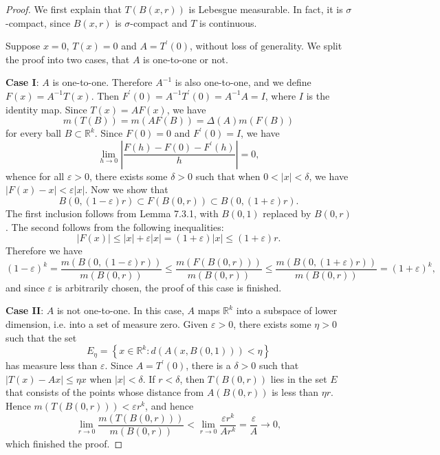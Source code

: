 \begin{proof}
We first explain that $T(B(x,r))$ is Lebesgue measurable. In fact, it is $\sigma$-compact, since $B(x,r)$ is $\sigma$-compact and $T$ is continuous.\par
Suppose $x=0$, $T(x)=0$ and $A=T^\prime(0)$, without loss of generality. We split the proof into two cases, that $A$ is one-to-one or not.\par
\textbf{Case I}: $A$ is one-to-one. Therefore $A^{-1}$ is also one-to-one, and we define $F(x)=A^{-1}T(x)$. Then $F^\prime(0)=A^{-1}T^\prime(0)=A^{-1}A=I$, where $I$ is the identity map. Since $T(x)=AF(x)$, we have 
$$
m\left( T\left( B \right) \right) =m\left( AF\left( B \right) \right) =\Delta \left( A \right) m\left( F\left( B \right) \right) 
$$
for every ball $B\subset\mathbb{R}^k$. Since $F(0)=0$ and $F^\prime(0)=I$, we have 
$$
\lim_{h\rightarrow 0} \left| \frac{F\left( h \right) -F\left( 0 \right) -F^{\prime}\left( h \right)}{h} \right|=0,
$$
whence for all $\varepsilon>0$, there exists some $\delta>0$ such that when $0<|x|<\delta$, we have $|F(x)-x|<\varepsilon|x|$. Now we show that 
$$
B\left( 0,\left( 1-\varepsilon \right) r \right) \subset F\left( B\left( 0,r \right) \right) \subset B\left( 0,\left( 1+\varepsilon \right) r \right) .
$$
The first inclusion follows from Lemma 7.3.1, with $B(0,1)$ replaced by $B(0,r)$. The second follows from the following inequalities: 
$$
\left| F\left( x \right) \right|\le \left| x \right|+\varepsilon \left| x \right|=\left( 1+\varepsilon \right) \left| x \right|\le \left( 1+\varepsilon \right) r.
$$
Therefore we have 
$$
\left( 1-\varepsilon \right) ^k=\frac{m\left( B\left( 0,\left( 1-\varepsilon \right) r \right) \right)}{m\left( B\left( 0,r \right) \right)}\le \frac{m\left( F\left( B\left( 0,r \right) \right) \right)}{m\left( B\left( 0,r \right) \right)}\le \frac{m\left( B\left( 0,\left( 1+\varepsilon \right) r \right) \right)}{m\left( B\left( 0,r \right) \right)}=\left( 1+\varepsilon \right) ^k,
$$
and since $\varepsilon$ is arbitrarily chosen, the proof of this case is finished.\par
\textbf{Case II}: $A$ is not one-to-one. In this case, $A$ maps $\mathbb{R}^k$ into a subspace of lower dimension, i.e. into a set of measure zero. Given $\varepsilon>0$, there exists some $\eta>0$ such that the set 
$$
E_{\eta}=\left\{ x\in \mathbb{R} ^k:d\left(A\left( x,B\left( 0,1 \right)\right) \right) <\eta \right\} 
$$
has measure less than $\varepsilon$. Since $A=T^\prime(0)$, there is a $\delta>0$ such that $|T(x)-Ax|\le\eta x$ when $|x|<\delta$. If $r<\delta$, then $T(B(0,r))$ lies in the set $E$ that consists of the points whose distance from $A(B(0,r))$ is less than $\eta r$. Hence $m(T(B(0,r)))<\varepsilon r^k$, and hence 
$$
\lim_{r\rightarrow 0} \frac{m\left( T\left( B\left( 0,r \right) \right) \right)}{m\left( B\left( 0,r \right) \right)}<\lim_{r\rightarrow 0} \frac{\varepsilon r^k}{Ar^k}=\frac{\varepsilon}{A}\rightarrow 0,
$$
which finished the proof.
\end{proof}
